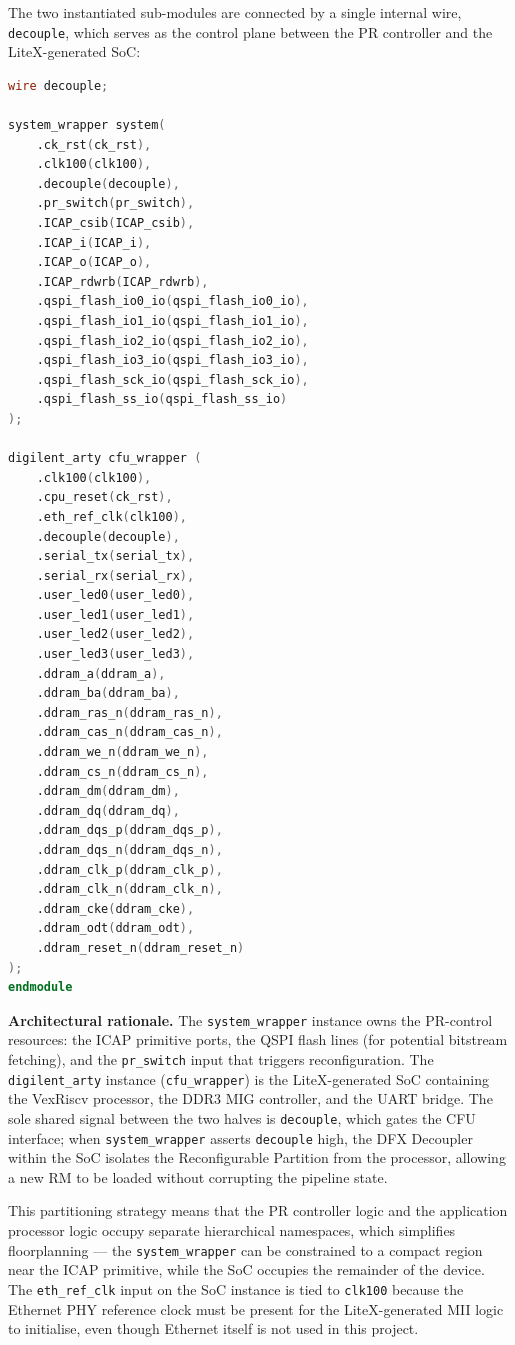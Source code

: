 The two instantiated sub-modules are connected by a single internal wire, \texttt{decouple}, which serves as the control plane between the PR controller and the LiteX-generated SoC:

\begin{lstlisting}[style=mystyle, language=Verilog]
wire decouple;

system_wrapper system(
    .ck_rst(ck_rst),
    .clk100(clk100),
    .decouple(decouple),
    .pr_switch(pr_switch),
    .ICAP_csib(ICAP_csib),
    .ICAP_i(ICAP_i),
    .ICAP_o(ICAP_o),
    .ICAP_rdwrb(ICAP_rdwrb),
    .qspi_flash_io0_io(qspi_flash_io0_io),
    .qspi_flash_io1_io(qspi_flash_io1_io),
    .qspi_flash_io2_io(qspi_flash_io2_io),
    .qspi_flash_io3_io(qspi_flash_io3_io),
    .qspi_flash_sck_io(qspi_flash_sck_io),
    .qspi_flash_ss_io(qspi_flash_ss_io)
);

digilent_arty cfu_wrapper (
    .clk100(clk100),
    .cpu_reset(ck_rst),
    .eth_ref_clk(clk100),
    .decouple(decouple),
    .serial_tx(serial_tx),
    .serial_rx(serial_rx),
    .user_led0(user_led0),
    .user_led1(user_led1),
    .user_led2(user_led2),
    .user_led3(user_led3),
    .ddram_a(ddram_a),
    .ddram_ba(ddram_ba),
    .ddram_ras_n(ddram_ras_n),
    .ddram_cas_n(ddram_cas_n),
    .ddram_we_n(ddram_we_n),
    .ddram_cs_n(ddram_cs_n),
    .ddram_dm(ddram_dm),
    .ddram_dq(ddram_dq),
    .ddram_dqs_p(ddram_dqs_p),
    .ddram_dqs_n(ddram_dqs_n),
    .ddram_clk_p(ddram_clk_p),
    .ddram_clk_n(ddram_clk_n),
    .ddram_cke(ddram_cke),
    .ddram_odt(ddram_odt),
    .ddram_reset_n(ddram_reset_n)
);
endmodule
\end{lstlisting}

\textbf{Architectural rationale.} The \texttt{system\_wrapper} instance owns the PR-control resources: the ICAP primitive ports, the QSPI flash lines (for potential bitstream fetching), and the \texttt{pr\_switch} input that triggers reconfiguration. The \texttt{digilent\_arty} instance (\texttt{cfu\_wrapper}) is the LiteX-generated SoC containing the VexRiscv processor, the DDR3 MIG controller, and the UART bridge. The sole shared signal between the two halves is \texttt{decouple}, which gates the CFU interface; when \texttt{system\_wrapper} asserts \texttt{decouple} high, the DFX Decoupler within the SoC isolates the Reconfigurable Partition from the processor, allowing a new RM to be loaded without corrupting the pipeline state.

This partitioning strategy means that the PR controller logic and the application processor logic occupy separate hierarchical namespaces, which simplifies floorplanning — the \texttt{system\_wrapper} can be constrained to a compact region near the ICAP primitive, while the SoC occupies the remainder of the device. The \texttt{eth\_ref\_clk} input on the SoC instance is tied to \texttt{clk100} because the Ethernet PHY reference clock must be present for the LiteX-generated MII logic to initialise, even though Ethernet itself is not used in this project.

